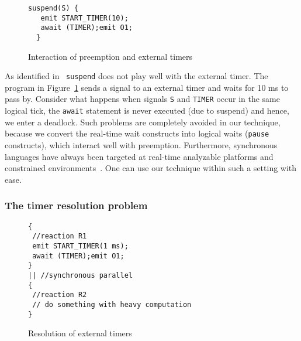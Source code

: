 \begin{figure}[h!]
  \centering
	\vspace{-10pt}
		\begin{lstlisting}[style=sysj,basicstyle=\footnotesize\ttfamily,morekeywords={emit,trap,pause,exit,delay,suspend}]
  suspend(S) {
   emit START_TIMER(10); 
   await (TIMER);emit O1;
  }
		\end{lstlisting}
  \caption{Interaction of preemption and external timers}
  \label{fig:preemp}
	\vspace{-10pt}
\end{figure}

As identified in~\cite{Bourke2009a} \texttt{suspend} does not play well
with the external timer. The program in Figure~\ref{fig:preemp} sends a
signal to an external timer and waits for 10 ms to pass by. Consider
what happens when signals \texttt{S} and \texttt{TIMER} occur in the
same logical tick, the \texttt{await} statement is never executed (due
to suspend) and hence, we enter a deadlock. Such problems are completely
avoided in our technique, because we convert the real-time wait
constructs into logical waits (\texttt{pause} constructs), which
interact well with preemption.  Furthermore, synchronous languages have
always been targeted at real-time analyzable platforms and constrained
environments~\cite{DBLP:journals/pieee/SifakisTY03,boldt07}. One can use
our technique within such a setting with ease.

\subsubsection{The timer resolution problem}
\label{sec:resolution-real-time}

\begin{figure}[h!]
  \centering
	\vspace{-10pt}
        \begin{lstlisting}[style=sysj,basicstyle=\footnotesize\ttfamily,morekeywords={emit,trap,pause,exit,delay,suspend}]
{
 //reaction R1
 emit START_TIMER(1 ms); 
 await (TIMER);emit O1;
}
|| //synchronous parallel
{
 //reaction R2
 // do something with heavy computation
}
		\end{lstlisting}
  \caption{Resolution of external timers}
  \label{fig:resolution}
	\vspace{-10pt}
\end{figure}

